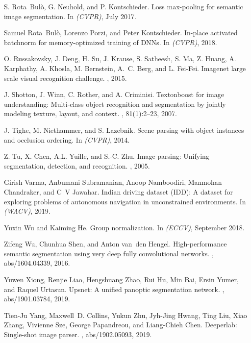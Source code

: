 \documentclass[10pt,twocolumn,letterpaper]{article}
\begin{document}
{\begin{thebibliography}{10}
S. Rota~Bul\`o, G. Neuhold, and P. Kontschieder.
\newblock Loss max-pooling for semantic image segmentation.
\newblock In {\em (CVPR)}, July 2017.

Samuel Rota~Bul\`o, Lorenzo Porzi, and Peter Kontschieder.
\newblock In-place activated batchnorm for memory-optimized training of {DNN}s.
\newblock In {\em (CVPR)}, 2018.

O. Russakovsky, J. Deng, H. Su, J. Krause, S. Satheesh, S. Ma, Z. Huang, A.
  Karphathy, A. Khosla, M. Bernstein, A.~C. Berg, and L. Fei-Fei.
\newblock Imagenet large scale visual recognition challenge.
, 2015.

J. Shotton, J. Winn, C. Rother, and A. Criminisi.
\newblock Textonboost for image understanding: Multi-class object recognition
  and segmentation by jointly modeling texture, layout, and context.
, 81(1):2--23, 2007.

J. Tighe, M. Niethammer, and S. Lazebnik.
\newblock Scene parsing with object instances and occlusion ordering.
\newblock In {\em (CVPR)}, 2014.

Z. Tu, X. Chen, A.L. Yuille, and S.-C. Zhu.
\newblock Image parsing: Unifying segmentation, detection, and recognition.
, 2005.

Girish Varma, Anbumani Subramanian, Anoop Namboodiri, Manmohan Chandraker, and
  C~V Jawahar.
\newblock Indian driving dataset ({IDD}): A dataset for exploring problems of
  autonomous navigation in unconstrained environments.
\newblock In {\em (WACV)}, 2019.

Yuxin Wu and Kaiming He.
\newblock Group normalization.
\newblock In {\em (ECCV)}, September 2018.

Zifeng Wu, Chunhua Shen, and Anton van~den Hengel.
\newblock High-performance semantic segmentation using very deep fully
  convolutional networks.
, abs/1604.04339, 2016.

Yuwen Xiong, Renjie Liao, Hengshuang Zhao, Rui Hu, Min Bai, Ersin Yumer, and
  Raquel Urtasun.
\newblock Upsnet: {A} unified panoptic segmentation network.
, abs/1901.03784, 2019.

Tien{-}Ju Yang, Maxwell~D. Collins, Yukun Zhu, Jyh{-}Jing Hwang, Ting Liu, Xiao
  Zhang, Vivienne Sze, George Papandreou, and Liang{-}Chieh Chen.
\newblock Deeperlab: Single-shot image parser.
, abs/1902.05093, 2019.


\end{thebibliography}}
\end{document}
